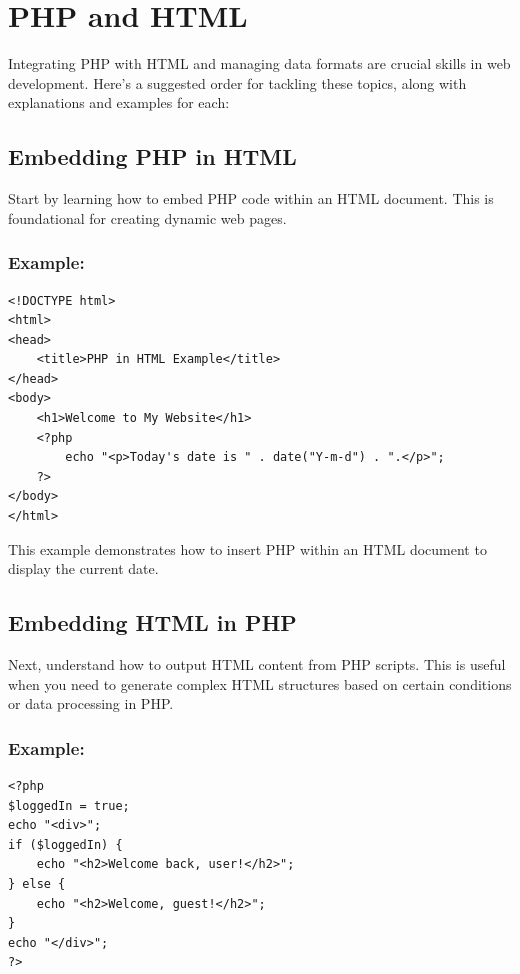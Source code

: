 \documentclass[11pt]{article}
\date{}
\title{}
\begin{document}
\setcounter{tocdepth}{3}
\tableofcontents

\setlength\parindent{10pt}


\section{PHP and HTML}
\label{sec:orgd224f90}

Integrating PHP with HTML and managing data formats are crucial skills
in web development. Here's a suggested order for tackling these topics,
along with explanations and examples for each:

\subsection{Embedding PHP in HTML}
\label{sec:orgc0505e7}
Start by learning how to embed PHP code within an HTML document. This is
foundational for creating dynamic web pages.

\subsubsection{Example:}
\label{sec:orgd2054ac}
\begin{verbatim}
<!DOCTYPE html>
<html>
<head>
    <title>PHP in HTML Example</title>
</head>
<body>
    <h1>Welcome to My Website</h1>
    <?php
        echo "<p>Today's date is " . date("Y-m-d") . ".</p>";
    ?>
</body>
</html>
\end{verbatim}

This example demonstrates how to insert PHP within an HTML document to
display the current date.

\subsection{Embedding HTML in PHP}
\label{sec:org71fefc5}
Next, understand how to output HTML content from PHP scripts. This is
useful when you need to generate complex HTML structures based on
certain conditions or data processing in PHP.

\subsubsection{Example:}
\label{sec:org72e313a}
\begin{verbatim}
<?php
$loggedIn = true;
echo "<div>";
if ($loggedIn) {
    echo "<h2>Welcome back, user!</h2>";
} else {
    echo "<h2>Welcome, guest!</h2>";
}
echo "</div>";
?>
\end{verbatim}
\end{document}
